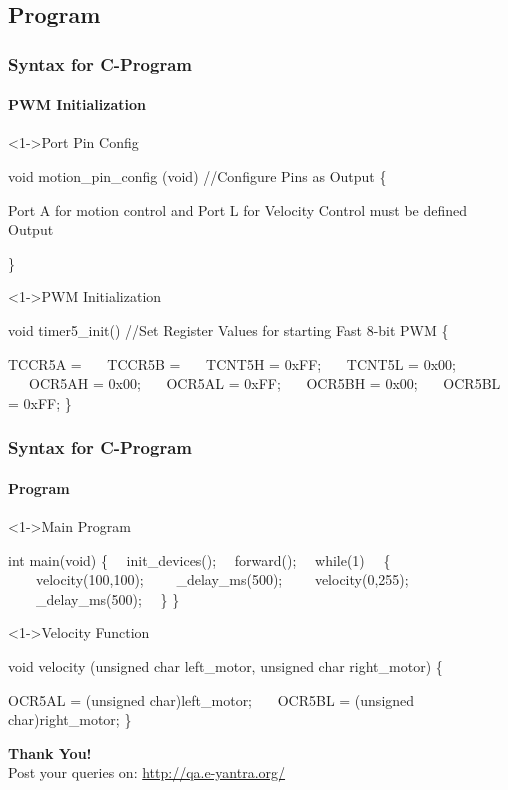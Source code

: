 \documentclass[10pt,red]{beamer}
\begin{document}
\subsection{Program}
\begin{frame}[shrink = 4,fragile]
	\frametitle{Syntax for C-Program} \pause
	\framesubtitle{PWM Initialization}
		\begin{block}<1->{Port Pin Config}	\pause
		\begin{semiverbatim}
				\scriptsize{
				void motion_pin_config (void) \color{green} //Configure Pins as Output\color{black}
				\{
					 
					 Port A for motion control and Port L for Velocity Control must be defined Output
					 
				\} }
			\end{semiverbatim}
		\end{block} \pause
	
	\begin{block}<1->{PWM Initialization}	\pause
		\begin{semiverbatim}
				\scriptsize{
				void timer5_init()	\color{green} //Set Register Values for starting Fast 8-bit PWM  \color{black}
				\{
					 
  					TCCR5A =  
			\ \ \	TCCR5B =
			\ \ \	TCNT5H = 0xFF; 
			\ \ \	TCNT5L = 0x00; 
			\ \ \	OCR5AH = 0x00;
			\ \ \ OCR5AL = 0xFF;
			\ \ \	OCR5BH = 0x00;
			\ \ \ OCR5BL = 0xFF;
				\} }
			\end{semiverbatim}
		\end{block} 
\end{frame}

\begin{frame}[shrink = 2,fragile]
	\frametitle{Syntax for C-Program} \pause
	\framesubtitle{Program}
		\begin{block}<1->{Main Program}	\pause
		\begin{semiverbatim}
				\scriptsize{
				int main(void)
				\{
			\ \		init_devices(); 
			\ \		forward();
			\ \		while(1)
			\ \		\{
			\ \ \ \			velocity(100,100);
			\ \ \ \			_delay_ms(500);
			\ \ \ \			velocity(0,255);
			\ \ \ \			_delay_ms(500);
			\ \		\}
				\}
 }
			\end{semiverbatim}
		\end{block} \pause
	
	\begin{block}<1->{Velocity Function}	\pause
		\begin{semiverbatim}
				\scriptsize{
				void velocity (unsigned char left_motor, unsigned char right_motor)	
				\{
					 
			  		OCR5AL = (unsigned char)left_motor;
			\ \ \	OCR5BL = (unsigned char)right_motor;
				\}} 
			\end{semiverbatim}
		\end{block} 
\end{frame}

\begin{frame}
\hskip4cm
\textbf{\LARGE Thank You!} \\[20pt]
\hskip3cm
\scriptsize Post your queries on: 
\hyperref[www.e-yantra.org]{\color{blue} http://qa.e-yantra.org/ \color{black}} 
\end{frame}
\end{document}
